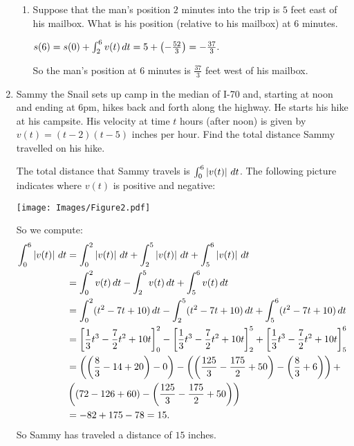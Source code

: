 \documentclass[nooutcomes]{ximera}
\begin{document}
\begin{problem}
\begin{enumerate}
\begin{enumerate}
		\item  Suppose that the man's position $2$ minutes into the trip is $5$ feet east of his mailbox.  What is his position (relative to his mailbox) at $6$ minutes.
			\begin{freeResponse}
			$s(6) = s(0) + \int_2^6 v(t) \,d t = 5 + \left(- \frac{52}{3} \right) = - \frac{37}{3}. $

			So the man's position at $6$ minutes is $\frac{37}{3}$ feet west of his mailbox.
			\end{freeResponse}
		\end{enumerate}

	\item  Sammy the Snail sets up camp in the median of I-70 and, starting at noon and ending at 6pm, hikes back and forth along the highway.  He starts his hike at his campsite.  His velocity at time $t$ hours (after noon)  is given by $v(t)=(t-2)(t-5)$ inches per hour.  Find the total distance Sammy travelled on his hike.
		\begin{freeResponse}
		The total distance that Sammy travels is $\int_0^6 \left| v(t) \right| \,d t$.
		The following picture indicates where $v(t)$ is positive and negative:
			\begin{image}
			\texttt{[image: Images/Figure2.pdf]}
			\end{image}
		So we compute:
			\begin{align*}
			\int_0^6 \left| v(t) \right| \,d t &= \int_0^2 \left| v(t) \right| \,d t + \int_2^5 \left| v(t) \right| \,d t + \int_5^6 \left| v(t) \right| \,d t  \\
			&= \int_0^2 v(t) \,d t - \int_2^5 v(t) \,d t + \int_5^6 v(t) \,d t  \\
			&= \int_0^2 (t^2 - 7t + 10) \,d t - \int_2^5 (t^2 - 7t + 10) \,d t + \int_5^6 (t^2 - 7t + 10) \,d t  \\
			&= \bigg[ \frac{1}{3}t^3-\frac{7}{2}t^2+10t \bigg]_0^2-\bigg[ \frac{1}{3}t^3-\frac{7}{2}t^2+10t \bigg]_2^5+\bigg[ \frac{1}{3}t^3-\frac{7}{2}t^2+10t \bigg]_5^6  \\
			&= \left( \left(\frac{8}{3}-14+20 \right)-0\right)-\left( \left( \frac{125}{3}-\frac{175}{2}+50 \right)-\left( \frac{8}{3}+6 \right) \right)+  \\
			&\left( \left( 72-126+60 \right) - \left( \frac{125}{3} - \frac{175}{2} + 50 \right) \right)  \\
			&= -82+175-78=15.
			\end{align*}
		So Sammy has traveled a distance of $15$ inches.
		\end{freeResponse}
	\end{enumerate}
\end{problem}
\end{document}
